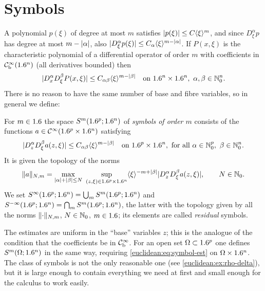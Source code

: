 \section{Symbols}\label{euclidean:sec:symbols}

A polynomial $p(\xi)$ of degree at most $m$ satisfies
$\lvert p(\xi)\rvert\le C\langle \xi\rangle^m$, and since $D^\alpha_\xi p$ has degree at most
$m-\lvert \alpha\rvert$, also $\lvert D^\alpha_\xi p(\xi)\rvert\le C_\alpha\langle \xi\rangle^{m-\lvert \alpha\rvert}$.
If $P(x,\xi)$ is the characteristic polynomial of a differential operator of
order $m$ with coefficients in $\mathcal{C}^\infty_{\mathrm{b}}(1.6^n)$ (all derivatives bounded) then
\begin{equation*}
  \lvert D^\alpha_xD^\beta_\xi P(x,\xi)\rvert\le C_{\alpha\beta}\langle \xi\rangle^{m-\lvert \beta\rvert}
  \quad\text{on }1.6^n\times1.6^n,\ \alpha,\beta\in\mathbb{N}_0^n.
\end{equation*}
There is no reason to have the same number of base and fibre variables, so in
general we define:

\begin{definition}\label{euclidean:def:symbols}
  For $m\in1.6$ the space $S^m(1.6^p;1.6^n)$ of \emph{symbols of order $m$}
  consists of the functions $a\in\mathcal{C}^\infty(1.6^p\times1.6^n)$ satisfying
  \begin{equation}\label{euclidean:eq:symbol-est}
    \abs{D^\alpha_zD^\beta_\xi a(z,\xi)}\le C_{\alpha\beta}\ang\xi^{m-\abs\beta}
    \quad\text{on }\R^p\times\R^n,\ \text{for all }\alpha\in\N_0^p,\ \beta\in\N_0^n.
  \end{equation}
  It is given the topology of the norms
  \begin{equation*}
    \norm a_{N,m}=\max_{\abs\alpha+\abs\beta\le N}\ \sup_{(z,\xi)\in\R^p\times\R^n}
    \ang\xi^{-m+\abs\beta}\abs{D^\alpha_zD^\beta_\xi a(z,\xi)},\qquad N\in\N_0.
  \end{equation*}
  We set $S^\infty(1.6^p;1.6^n)=\bigcup_mS^m(1.6^p;1.6^n)$ and
  $S^{-\infty}(1.6^p;1.6^n)=\bigcap_mS^m(1.6^p;1.6^n)$, the latter with the
  topology given by all the norms $\lVert \cdot\rVert_{N,m}$, $N\in\mathbb{N}_0$, $m\in1.6$;
  its elements are called \emph{residual} symbols.
\end{definition}

\begin{remark}\label{euclidean:rem:symbols-open}
  The estimates are uniform in the ``base'' variables $z$; this is the
  analogue of the condition that the coefficients be in $\mathcal{C}^\infty_{\mathrm{b}}$. For an open
  set $\Omega\subset1.6^p$ one defines $S^m(\Omega;1.6^n)$ in the same way,
  requiring \eqref{euclidean:eq:symbol-est} on $\Omega\times1.6^n$. The class
  of symbols is not the only reasonable one (see
  \cref{euclidean:ex:rho-delta}), but it is large enough to contain everything
  we need at first and small enough for the calculus to work easily.
\end{remark}

